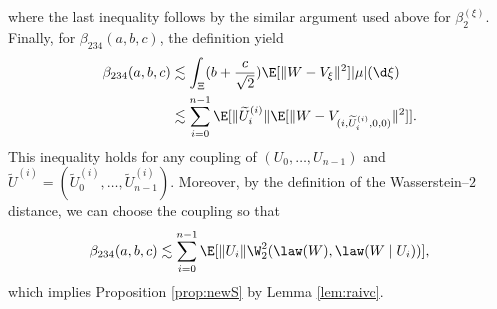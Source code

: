 \documentclass[mnsc,nonblindrev]{informs3}
\begin{document}
where the last inequality follows by the similar argument used above for \(\beta_2^{(\xi)}\). Finally, for \(\beta_{234}(a,b,c)\), the definition yield
\begin{align*}
\beta_{234}(a,b,c) &\lesssim \int_{\Xi}  (b+\frac{c}{\sqrt{2}})\E[\|W-V_\xi\|^2] |\mu|(\d \xi)\\
&\lesssim \sum_{i=0}^{n-1}\E[\|\widetilde U_i^{(i)}\|\E[\|W-V_{(i,\widetilde U_i^{(i)},0,0)}\|^2]].
\end{align*}
This inequality holds for any coupling of $(U_0,\ldots,U_{n-1})$ and
$\widetilde U^{(i)}=(\widetilde U^{(i)}_0,\ldots,\widetilde U^{(i)}_{n-1})$.
Moreover, by the definition of the Wasserstein--$2$ distance, we can choose the coupling so that
\begin{equation*}
\beta_{234}(a,b,c)\lesssim \sum_{i=0}^{n-1}\E[\|U_i\|\W_2^2(\law(W), \law(W \mid U_i))], 
\end{equation*}
which implies Proposition \ref{prop:newS} by Lemma \ref{lem:raivc}.
\end{document}
